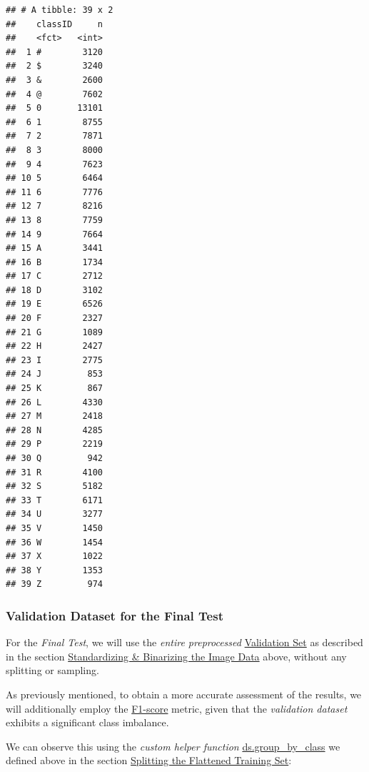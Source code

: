 \documentclass[
]{report}
\newenvironment{Shaded}{\begin{snugshade}}{\end{snugshade}}
\newcommand{\AttributeTok}[1]{\textcolor[rgb]{0.13,0.29,0.53}{#1}}
\newcommand{\FunctionTok}[1]{\textcolor[rgb]{0.13,0.29,0.53}{\textbf{#1}}}
\newcommand{\NormalTok}[1]{#1}
\newcommand{\SpecialCharTok}[1]{\textcolor[rgb]{0.81,0.36,0.00}{\textbf{#1}}}
\begin{document}
\begin{verbatim}
## # A tibble: 39 x 2
##    classID     n
##    <fct>   <int>
##  1 #        3120
##  2 $        3240
##  3 &        2600
##  4 @        7602
##  5 0       13101
##  6 1        8755
##  7 2        7871
##  8 3        8000
##  9 4        7623
## 10 5        6464
## 11 6        7776
## 12 7        8216
## 13 8        7759
## 14 9        7664
## 15 A        3441
## 16 B        1734
## 17 C        2712
## 18 D        3102
## 19 E        6526
## 20 F        2327
## 21 G        1089
## 22 H        2427
## 23 I        2775
## 24 J         853
## 25 K         867
## 26 L        4330
## 27 M        2418
## 28 N        4285
## 29 P        2219
## 30 Q         942
## 31 R        4100
## 32 S        5182
## 33 T        6171
## 34 U        3277
## 35 V        1450
## 36 W        1454
## 37 X        1022
## 38 Y        1353
## 39 Z         974
\end{verbatim}

\normalsize

\newpage

\subsubsection{Validation Dataset for the Final Test}\label{validation-dataset-for-the-final-test}

\hfill\break

For the \emph{Final Test}, we will use the \emph{entire preprocessed} \hyperref[validation_set.struct]{Validation Set} as described in the section \hyperref[standardizing-binarizing-the-image-data]{Standardizing \& Binarizing the Image Data} above, without any splitting or sampling.

As previously mentioned, to obtain a more accurate assessment of the results, we will additionally employ the \href{https://rafalab.dfci.harvard.edu/dsbook-part-2/ml/evaluation-metrics.html\#balanced-accuracy-and-f_1-score}{F1-score} metric, given that the \emph{validation dataset} exhibits a significant class imbalance.

We can observe this using the \emph{custom helper function} \hyperref[func.ds.group_by_class]{ds.group\_by\_class} we defined above in the section \hyperref[splitting-the-flattened-training-set]{Splitting the Flattened Training Set}:

\begin{Shaded}
\end{Shaded}
\end{document}
